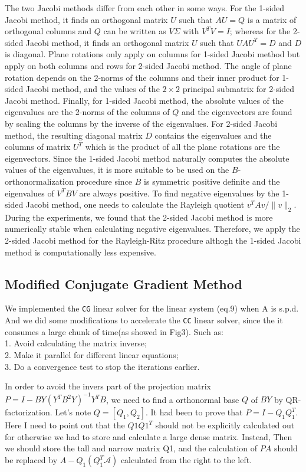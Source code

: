 The two Jacobi methods differ from each other in some ways. For the 1-sided Jacobi method, it finds an orthogonal
matrix $U$ such that $A U = Q$ is a matrix of orthogonal columns and $Q$ can be written as $V \Sigma$ with
$V^T V = I$; whereas for the 2-sided Jacobi method, it finds an orthogonal matrix $U$ such that $UAU^T = D$ and
$D$ is diagonal. Plane rotations only apply on columns for 1-sided Jacobi method but apply on both columns and rows
for 2-sided Jacobi method. The angle of plane rotation depends on the 2-norms of the columns and their inner
product for 1-sided Jacobi method, and the values of the $2 \times 2$ principal submatrix for 2-sided Jacobi method.
Finally, for 1-sided Jacobi method, the absolute values of the eigenvalues are the 2-norms of the columns of $Q$ and
the eigenvectors are found by scaling the columns by the inverse of the eigenvalues. For 2-sided Jacobi method, the
resulting diagonal matrix $D$ contains the eigenvalues and the columns of matrix $U^T$ which is the product of all
the plane rotations are the eigenvectors. Since the 1-sided Jacobi method naturally computes the absolute values of
the eigenvalues, it is more suitable to be used on the $B$-orthonormalization procedure since $B$ is symmetric
positive definite and the eigenvalues of $V^T B V$ are always positive. To find negative eigenvalues by the 1-sided
Jacobi method, one needs to calculate the Rayleigh quotient $v^T A v / \|v\|_2$. During the experiments, we found
that the 2-sided Jacobi method is more numerically stable when calculating negative eigenvalues. Therefore, we
apply the 2-sided Jacobi method for the Rayleigh-Ritz procedure althogh the 1-sided Jacobi method is computationally
less expensive.

\subsection{Modified Conjugate Gradient Method}
We implemented the {\tt CG} linear solver for the linear system (eq.9) when A is s.p.d. And we did some modifications to accelerate the {\tt CC} linear solver, since the it consumes a large chunk of time(as showed in Fig3). Such as:\\1. Avoid calculating the matrix inverse;\\2. Make it parallel for different linear equations;\\3. Do a convergence test to stop the iterations earlier.


In order to avoid the invers part of the projection matrix $P=I-BY(Y^TB^2Y)^{-1}Y^TB$, we need to find a orthonormal base $Q$ of $BY$ by QR-factorization. Let's note $Q=[Q_1, Q_2]$. It had been to prove that $P=I-Q_1Q_1^T$. Here I need to point out that the $Q1Q1^T$ should not be explicitly calculated out for otherwise we had to store and calculate a large dense matrix. Instead, Then we should store the tall and narrow matrix Q1, and the calculation of $P A$ should be replaced by $A-Q_1(Q_1^T\mathcal{A})$ calculated from the right to the left.  


